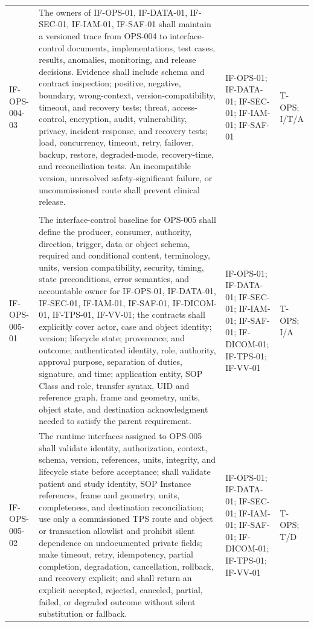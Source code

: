 \documentclass[11pt,letterpaper]{article}
\begin{document}
\begin{scriptsize}
\begin{longtable}{@{}L{0.14\textwidth}L{0.49\textwidth}L{0.19\textwidth}L{0.10\textwidth}@{}}
\addlinespace[2pt]
\mbox{IF-OPS-004-03} & The owners of IF-OPS-01, IF-DATA-01, IF-SEC-01, IF-IAM-01, IF-SAF-01 shall maintain a versioned trace from OPS-004 to interface-control documents, implementations, test cases, results, anomalies, monitoring, and release decisions. Evidence shall include schema and contract inspection; positive, negative, boundary, wrong-context, version-compatibility, timeout, and recovery tests; threat, access-control, encryption, audit, vulnerability, privacy, incident-response, and recovery tests; load, concurrency, timeout, retry, failover, backup, restore, degraded-mode, recovery-time, and reconciliation tests. An incompatible version, unresolved safety-significant failure, or uncommissioned route shall prevent clinical release. & IF-OPS-01; IF-DATA-01; IF-SEC-01; IF-IAM-01; IF-SAF-01 & T-OPS; I\slash\allowbreak{}T\slash\allowbreak{}A \\
\addlinespace[2pt]
 \\
\addlinespace[2pt]
\mbox{IF-OPS-005-01} & The interface-control baseline for OPS-005 shall define the producer, consumer, authority, direction, trigger, data or object schema, required and conditional content, terminology, units, version compatibility, security, timing, state preconditions, error semantics, and accountable owner for IF-OPS-01, IF-DATA-01, IF-SEC-01, IF-IAM-01, IF-SAF-01, IF-DICOM-01, IF-TPS-01, IF-VV-01; the contracts shall explicitly cover actor, case and object identity; version; lifecycle state; provenance; and outcome; authenticated identity, role, authority, approval purpose, separation of duties, signature, and time; application entity, SOP Class and role, transfer syntax, UID and reference graph, frame and geometry, units, object state, and destination acknowledgment needed to satisfy the parent requirement. & IF-OPS-01; IF-DATA-01; IF-SEC-01; IF-IAM-01; IF-SAF-01; IF-DICOM-01; IF-TPS-01; IF-VV-01 & T-OPS; I\slash\allowbreak{}A \\
\addlinespace[2pt]
\mbox{IF-OPS-005-02} & The runtime interfaces assigned to OPS-005 shall validate identity, authorization, context, schema, version, references, units, integrity, and lifecycle state before acceptance; shall validate patient and study identity, SOP Instance references, frame and geometry, units, completeness, and destination reconciliation; use only a commissioned TPS route and object or transaction allowlist and prohibit silent dependence on undocumented private fields; make timeout, retry, idempotency, partial completion, degradation, cancellation, rollback, and recovery explicit; and shall return an explicit accepted, rejected, canceled, partial, failed, or degraded outcome without silent substitution or fallback. & IF-OPS-01; IF-DATA-01; IF-SEC-01; IF-IAM-01; IF-SAF-01; IF-DICOM-01; IF-TPS-01; IF-VV-01 & T-OPS; T\slash\allowbreak{}D \\

\end{longtable}
\end{scriptsize}
\end{document}
